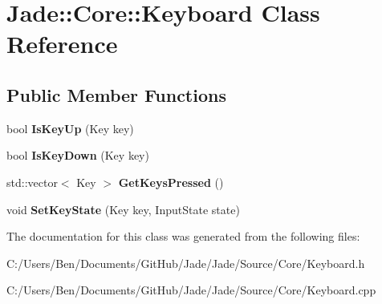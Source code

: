 \hypertarget{class_jade_1_1_core_1_1_keyboard}{}\section{Jade\+:\+:Core\+:\+:Keyboard Class Reference}
\label{class_jade_1_1_core_1_1_keyboard}
\subsection*{Public Member Functions}
\begin{DoxyCompactItemize}
\item 
\hypertarget{class_jade_1_1_core_1_1_keyboard_aebf2b8eba886c4ff9b9b8968c63086ae}{}bool {\bfseries Is\+Key\+Up} (Key key)\label{class_jade_1_1_core_1_1_keyboard_aebf2b8eba886c4ff9b9b8968c63086ae}

\item 
\hypertarget{class_jade_1_1_core_1_1_keyboard_a66e93c2b9b8af7d987cf2a3d8de0d7ad}{}bool {\bfseries Is\+Key\+Down} (Key key)\label{class_jade_1_1_core_1_1_keyboard_a66e93c2b9b8af7d987cf2a3d8de0d7ad}

\item 
\hypertarget{class_jade_1_1_core_1_1_keyboard_ad7f76a19d9aa08f71d7013e8fe9cff28}{}std\+::vector$<$ Key $>$ {\bfseries Get\+Keys\+Pressed} ()\label{class_jade_1_1_core_1_1_keyboard_ad7f76a19d9aa08f71d7013e8fe9cff28}

\item 
\hypertarget{class_jade_1_1_core_1_1_keyboard_a04bfc676f28ad78f94be50408c9b6be0}{}void {\bfseries Set\+Key\+State} (Key key, Input\+State state)\label{class_jade_1_1_core_1_1_keyboard_a04bfc676f28ad78f94be50408c9b6be0}

\end{DoxyCompactItemize}


The documentation for this class was generated from the following files\+:\begin{DoxyCompactItemize}
\item 
C\+:/\+Users/\+Ben/\+Documents/\+Git\+Hub/\+Jade/\+Jade/\+Source/\+Core/Keyboard.\+h\item 
C\+:/\+Users/\+Ben/\+Documents/\+Git\+Hub/\+Jade/\+Jade/\+Source/\+Core/Keyboard.\+cpp\end{DoxyCompactItemize}

